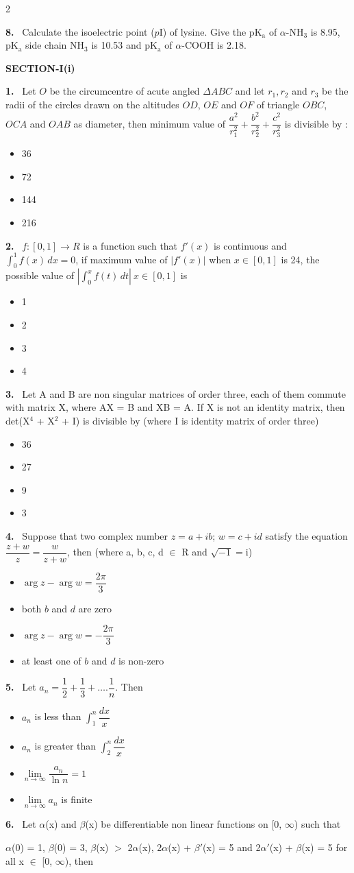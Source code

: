 \documentclass[10pt]{extarticle}
\newcommand{\partsec}[2]{\par\medskip\noindent{\large\bfseries PART-#1: #2}\par\smallskip}
\newcommand{\sect}[1]{\par\smallskip\noindent\textbf{#1}\par}
\newcommand{\qn}[1]{\par\smallskip\noindent\textbf{#1.}~}
\newenvironment{qoptions}{\begin{itemize}[leftmargin=1.8em,itemsep=1pt,topsep=2pt,label={}]}{\end{itemize}}
\newcommand{\opt}[2]{\item[(#1)] #2}
\begin{document}
\begin{multicols}{2}
\qn{8} Calculate the isoelectric point ($p$I) of lysine. Give the pK$_\mathrm{a}$ of $\alpha$-NH$_3$ is 8.95, pK$_\mathrm{a}$ side chain NH$_3$ is 10.53 and pK$_\mathrm{a}$ of $\alpha$-COOH is 2.18.
\partsec{3}{MATHEMATICS}
\sect{SECTION-I(i)}
\qn{1} Let $O$ be the circumcentre of acute angled $\Delta ABC$ and let $r_1,r_2$ and $r_3$ be the radii of the circles drawn on the altitudes $OD$, $OE$ and $OF$ of triangle $OBC$, $OCA$ and $OAB$ as diameter, then minimum value of $\dfrac{a^2}{r_1^2}+\dfrac{b^2}{r_2^2}+\dfrac{c^2}{r_3^2}$ is divisible by :
\begin{qoptions}
\opt{A}{36}
\opt{B}{72}
\opt{C}{144}
\opt{D}{216}
\end{qoptions}
\qn{2} $f:[0,1]\to R$ is a function such that $f'(x)$ is continuous and $\displaystyle\int_0^1f(x)\,dx=0$, if maximum value of $|f'(x)|$ when $x\in[0,1]$ is 24, the possible value of $\left|\displaystyle\int_0^xf(t)\,dt\right|\ x\in[0,1]$ is
\begin{qoptions}
\opt{A}{1}
\opt{B}{2}
\opt{C}{3}
\opt{D}{4}
\end{qoptions}
\qn{3} Let A and B are non singular matrices of order three, each of them commute with matrix X, where AX = B and XB = A. If X is not an identity matrix, then det(X$^4$ + X$^2$ + I) is divisible by (where I is identity matrix of order three)
\begin{qoptions}
\opt{A}{36}
\opt{B}{27}
\opt{C}{9}
\opt{D}{3}
\end{qoptions}
\qn{4} Suppose that two complex number $z=a+ib$; $w=c+id$ satisfy the equation $\dfrac{z+w}z=\dfrac w{z+w}$, then (where a, b, c, d $\in$ R and $\sqrt{-1}=\mathrm i$)
\begin{qoptions}
\opt{A}{$\arg z-\arg w=\dfrac{2\pi}3$}
\opt{B}{both $b$ and $d$ are zero}
\opt{C}{$\arg z-\arg w=-\dfrac{2\pi}3$}
\opt{D}{at least one of $b$ and $d$ is non-zero}
\end{qoptions}
\qn{5} Let $a_n=\dfrac12+\dfrac13+\ldots.\dfrac1n$. Then
\begin{qoptions}
\opt{A}{$a_n$ is less than $\displaystyle\int_1^n\dfrac{dx}x$}
\opt{B}{$a_n$ is greater than $\displaystyle\int_2^n\dfrac{dx}x$}
\opt{C}{$\lim\limits_{n\to\infty}\dfrac{a_n}{\ln n}=1$}
\opt{D}{$\lim\limits_{n\to\infty}a_n$ is finite}
\end{qoptions}
\qn{6} Let $\alpha$(x) and $\beta$(x) be differentiable non linear functions on [0, $\infty$) such that\par
$\alpha$(0) = 1, $\beta$(0) = 3, $\beta$(x) $>$ 2$\alpha$(x), 2$\alpha$(x) + $\beta'$(x) = 5 and 2$\alpha'$(x) + $\beta$(x) = 5 for all x $\in$ [0, $\infty$), then

\end{multicols}
\end{document}
